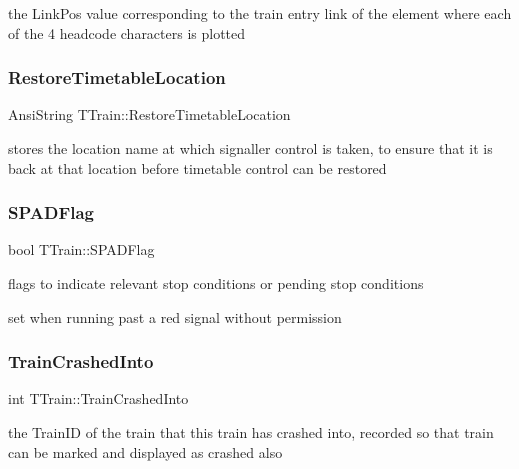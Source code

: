 the Link\+Pos value corresponding to the train entry link of the element where each of the 4 headcode characters is plotted \mbox{\label{class_t_train_a2fe228470644e5b9bcc95b3e75f9bf36}} 
\subsubsection{\texorpdfstring{Restore\+Timetable\+Location}{RestoreTimetableLocation}}
{\footnotesize\ttfamily Ansi\+String T\+Train\+::\+Restore\+Timetable\+Location\hspace{0.3cm}{\ttfamily [private]}}

stores the location name at which signaller control is taken, to ensure that it is back at that location before timetable control can be restored \mbox{\label{class_t_train_a05383ce005a22df0cb70df7f31a917cf}} 
\subsubsection{\texorpdfstring{S\+P\+A\+D\+Flag}{SPADFlag}}
{\footnotesize\ttfamily bool T\+Train\+::\+S\+P\+A\+D\+Flag\hspace{0.3cm}{\ttfamily [private]}}



flags to indicate relevant stop conditions or pending stop conditions 

set when running past a red signal without permission \mbox{\label{class_t_train_ad7644b30da32d0d9e6541ba7629a4a35}} 
\subsubsection{\texorpdfstring{Train\+Crashed\+Into}{TrainCrashedInto}}
{\footnotesize\ttfamily int T\+Train\+::\+Train\+Crashed\+Into\hspace{0.3cm}{\ttfamily [private]}}

the Train\+ID of the train that this train has crashed into, recorded so that train can be marked and displayed as crashed also \mbox{\label{class_t_train_a95a26f26e890d53e38f1f8067977ef0e}} 
